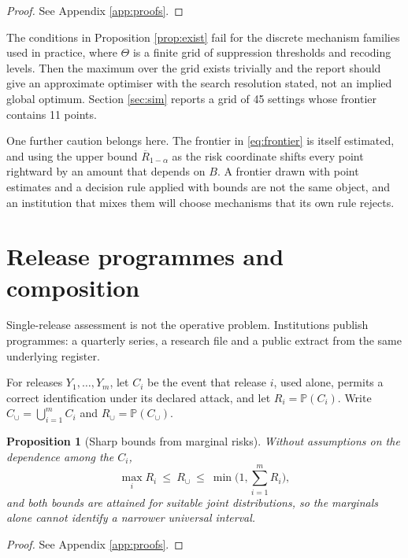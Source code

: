 \documentclass[11pt,a4paper]{article}
\theoremstyle{plain}
\newtheorem{proposition}{Proposition}
\theoremstyle{definition}
\theoremstyle{definition}
\theoremstyle{plain}
\newcommand{\Prob}{\mathbb{P}}
\begin{document}
\begin{proof}
See Appendix \ref{app:proofs}.
\end{proof}

The conditions in Proposition \ref{prop:exist} fail for the discrete mechanism
families used in practice, where $\Theta$ is a finite grid of suppression
thresholds and recoding levels. Then the maximum over the grid
exists trivially and the report should give an approximate optimiser with the
search resolution stated, not an implied global optimum. Section \ref{sec:sim} reports a grid of 45 settings whose frontier contains 11
points.

One further caution belongs here. The frontier in \eqref{eq:frontier} is itself
estimated, and using the upper bound $\overline{R}_{1-\alpha}$ as the risk coordinate
shifts every point rightward by an amount that depends on $B$. A frontier drawn
with point estimates and a decision rule applied with bounds are not the same
object, and an institution that mixes them will choose mechanisms that its own
rule rejects.

\section{Release programmes and composition}\label{sec:comp}

Single-release assessment is not the operative problem. Institutions publish
programmes: a quarterly series, a research file and a public extract from the
same underlying register.

For releases $Y_1, \dots, Y_m$, let $C_i$ be the event that release $i$, used
alone, permits a correct identification under its declared attack, and let $R_i
= \Prob(C_i)$. Write $C_\cup = \bigcup_{i=1}^m C_i$ and $R_\cup =
\Prob(C_\cup)$.

\begin{proposition}[Sharp bounds from marginal risks]\label{prop:boole}
Without assumptions on the dependence among the $C_i$,
\begin{equation}
\max_i R_i \ \leq \ R_\cup \ \leq \ \min\Big(1, \sum_{i=1}^m R_i\Big) ,
\label{eq:boole}
\end{equation}
and both bounds are attained for suitable joint distributions, so the marginals
alone cannot identify a narrower universal interval.
\end{proposition}

\begin{proof}
See Appendix \ref{app:proofs}.
\end{proof}
\end{document}
